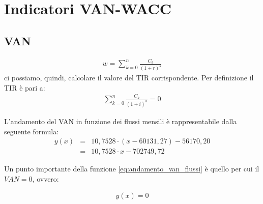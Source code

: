 \chapter[Indicatori VAN-WACC]{Indicatori VAN-WACC}
\section[VAN]{VAN}
	\begin{equation}
	\label{eq:van}
	\begin{split}
 		w = \sum_{k=0}^n \frac{C_k}{(1+r)^k}
	\end{split}
	\end{equation}
	ci possiamo, quindi, calcolare il valore del \ac{TIR} corrispondente. Per definizione il \ac{TIR} è pari a:
	\begin{equation}
	\label{eq:tir}
	\begin{split}
 		\sum_{k=0}^n \frac{C_k}{(1+i)^k} = 0
	\end{split}
	\end{equation}	 

	L'andamento del \ac{VAN} in funzione dei flussi mensili è rappresentabile dalla seguente formula:	
	\begin{eqnarray}
	\label{eq:andamento_van_flussi}
 		y(x) & = & 10,7528 \cdot ( x - 60131,27 ) - 56170,20		\nonumber \\
 			 & = & 10,7528 \cdot x - 702749,72
	\end{eqnarray}


Un punto importante della funzione \ref{eq:andamento_van_flussi} è quello per cui il $ VAN = 0 $, ovvero:

	\begin{equation}
	\label{eq:van_zero}
	\begin{split}
 		y(x) = 0
 	\end{split}
	\end{equation}

